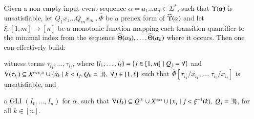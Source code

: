 \begin{lemma}\label{lemma:subst-quant}
  Given a non-empty input event sequence $\alpha = a_1 \ldots a_n \in
  \Sigma^*$, such that $\Upsilon({\alpha})$ is unsatisfiable, let
  $Q_1x_1 \ldots Q_mx_m ~.~ \widehat{\Phi}$ be a prenex form of
  $\widehat{\Upsilon}({\alpha})$ and let $\xi : [1,m] \rightarrow [n]$ be a
  monotonic function mapping each transition quantifier to the minimal
  index from the sequence $\widehat{\Theta}({\alpha_0}), \ldots,
  \widehat{\Theta}({\alpha_n})$ where it occurs. Then one can effectively build:
  \begin{compactenum}
  \item\label{it1:subst-quant} witness terms $\tau_{i_1}, \ldots,
    \tau_{i_\ell}$, where \(\{ i_1, \ldots,i_\ell \} = \{ j \in
      [1,m] \mid Q_j = \forall \}\) and \(\mathrm{V}({\tau_{i_j}}) \subseteq
    {X}^{\scriptscriptstyle{({\leq \xi(i_j)})}} \cup \{ x_k \mid k < i_j, Q_k =
      \exists \},~ \forall j \in [1,\ell]\) such that
    $\widehat{\Phi}[\tau_{i_1}/x_{i_1}, \ldots,
      \tau_{i_\ell}/x_{i_\ell}]$ is unsatisfiable, and
  \item\label{it2:subst-quant} a GLI $(I_0, \ldots, I_n)$ for
    $\alpha$, such that \(\mathrm{V}({I_k}) \subseteq {Q}^{\scriptscriptstyle{({k})}} \cup
    {X}^{\scriptscriptstyle{({\leq k})}} \cup \{ x_j \mid j < \xi^{-1}(k),~ Q_j =
      \exists \}\), for all $k \in [n]$. 
  \end{compactenum}
\end{lemma}
